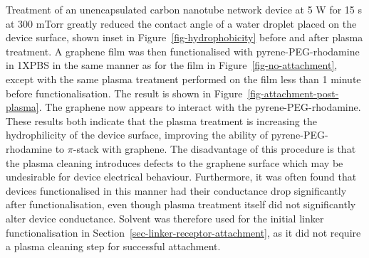 \documentclass[
  a4paper,
]{scrbook}
\begin{document}
Treatment of an unencapsulated carbon nanotube network device at 5 W for
15 s at 300 mTorr greatly reduced the contact angle of a water droplet
placed on the device surface, shown inset in
Figure~\ref{fig-hydrophobicity} before and after plasma treatment. A
graphene film was then functionalised with pyrene-PEG-rhodamine in 1XPBS
in the same manner as for the film in Figure~\ref{fig-no-attachment},
except with the same plasma treatment performed on the film less than 1
minute before functionalisation. The result is shown in
Figure~\ref{fig-attachment-post-plasma}. The graphene now appears to
interact with the pyrene-PEG-rhodamine. These results both indicate that
the plasma treatment is increasing the hydrophilicity of the device
surface, improving the ability of pyrene-PEG-rhodamine to \(\pi\)-stack
with graphene. The disadvantage of this procedure is that the plasma
cleaning introduces defects to the graphene surface which may be
undesirable for device electrical behaviour. Furthermore, it was often
found that devices functionalised in this manner had their conductance
drop significantly after functionalisation, even though plasma treatment
itself did not significantly alter device conductance. Solvent was
therefore used for the initial linker functionalisation in
Section~\ref{sec-linker-receptor-attachment}, as it did not require a
plasma cleaning step for successful attachment.
\end{document}
